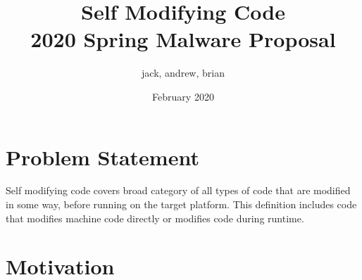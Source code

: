 \documentclass{article}
\title{Self Modifying Code \\ \small 2020 Spring Malware Proposal}
\author{jack, andrew, brian}
\date{February 2020}
\begin{document}
\maketitle

\section{Problem Statement}
Self modifying code covers broad category of all types of code that are modified in some way, before running 
on the target platform. This definition includes code that modifies machine code directly or modifies code during 
runtime. 



\section{Motivation}




\end{document}
